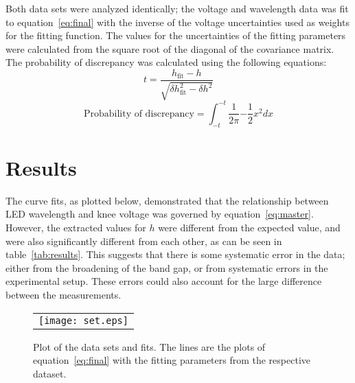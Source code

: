 \documentclass[12pt]{spieman}  %
\begin{document}
\begin{spacing}{2}
        Both data sets were analyzed identically;
        the voltage and wavelength data was fit to equation~\eqref{eq:final} with the inverse of the voltage
        uncertainties used as weights for the fitting function.
        The values for the uncertainties of the fitting parameters were calculated from the square root of the
        diagonal of the covariance matrix.
        The probability of discrepancy was calculated using the following equations:
        \begin{equation}
            \label{eq:t-value}
            t=\frac{h_{\text{fit}}-h}{\sqrt{\delta h_{\text{fit}}^2-\delta h^2}}
        \end{equation}
        \begin{equation}
            \label{eq:prob}
            \text{Probability of discrepancy}=\int_{-t}^{-t}\frac{1}{2\pi}{-\frac{1}{2}x^2}dx
        \end{equation}


        \section{Results}\label{sec:results}

        The curve fits, as plotted below, demonstrated that the relationship between LED wavelength and knee voltage
        was governed by equation~\eqref{eq:master}.
        However, the extracted values for $h$ were different from the expected value, and were also significantly
        different from each other, as can be seen in table~\ref{tab:results}.
        This suggests that there is some systematic error in the data;
        either from the broadening of the band gap, or from systematic errors in the experimental setup.
        These errors could also account for the large difference between the measurements.

        \begin{figure}[H]
            \label{fig:figure1}
            \begin{center}
                \begin{tabular}{c}
                    \texttt{[image: set.eps]}
                \end{tabular}
            \end{center}
            \caption {Plot of the data sets and fits. The lines are the plots of equation~\eqref{eq:final} with the
            fitting parameters from the respective dataset.}
        \end{figure}


\end{spacing}
\end{document}
